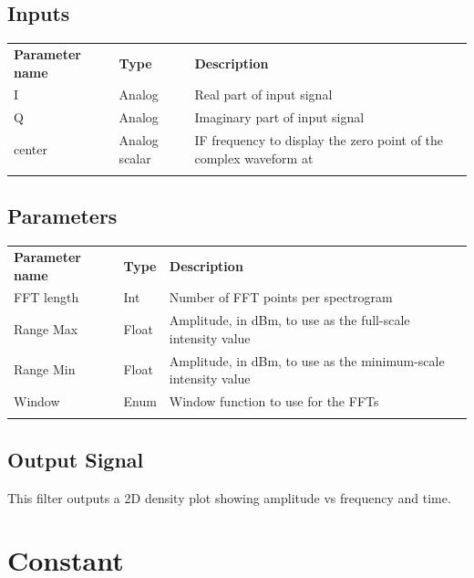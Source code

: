 \FloatBarrier

\subsection{Inputs}

\begin{tabularx}{16cm}{llX}
\thickhline
\textbf{Parameter name} & \textbf{Type} & \textbf{Description} \\
\thickhline
I & Analog & Real part of input signal\\
\thinhline
Q & Analog & Imaginary part of input signal\\
\thinhline
center & Analog scalar & IF frequency to display the zero point of the complex waveform at\\
\thickhline
\end{tabularx}

\subsection{Parameters}

\begin{tabularx}{16cm}{llX}
\thickhline
\textbf{Parameter name} & \textbf{Type} & \textbf{Description} \\
\thickhline
FFT length & Int & Number of FFT points per spectrogram\\
\thinhline
Range Max & Float & Amplitude, in dBm, to use as the full-scale intensity value\\
\thinhline
Range Min & Float & Amplitude, in dBm, to use as the minimum-scale intensity value\\
\thinhline
Window & Enum & Window function to use for the FFTs\\
\thickhline
\end{tabularx}

\subsection{Output Signal}

This filter outputs a 2D density plot showing amplitude vs frequency and time.

\pagebreak
\section{Constant}
\label{filter:constant}

